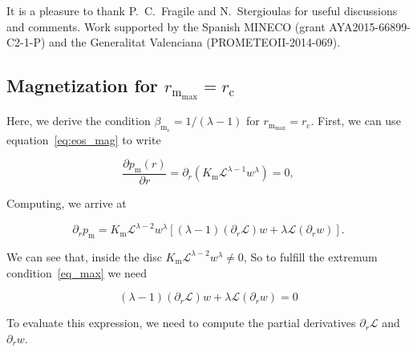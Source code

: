\documentclass[]{aa}
\begin{document}
\begin{acknowledgements}
It is a pleasure to thank P.~C.~Fragile and N.~Stergioulas for useful discussions and comments. Work supported by the Spanish MINECO (grant AYA2015-66899-C2-1-P) and the Generalitat Valenciana (PROMETEOII-2014-069).
\end{acknowledgements}




\begin{appendix}
\section{Magnetization for $r_{\mathrm{m}_{\mathrm{max}}} = r_{\mathrm{c}}$}\label{app_magmax}

Here, we derive the condition $\beta_{\mathrm{m}_{\mathrm{c}}} = 1/(\lambda - 1)$ for $r_{\mathrm{m}_{\mathrm{max}}} = r_{\mathrm{c}}$.
First, we can use equation~\eqref{eq:eos_mag} to write 

\begin{equation}\label{eq_max}
\frac{\partial{p_{\mathrm{m}}(r)}}{\partial r} = \partial_{r} \left(K_{\mathrm{m}} \mathcal{L}^{\lambda -1} w^{\lambda}\right) = 0,
\end{equation}

Computing, we arrive at

\begin{equation}
\partial_{r} p_{\mathrm{m}} = K_{\mathrm{m}} \mathcal{L}^{\lambda - 2}w^{\lambda} [(\lambda - 1)(\partial_r \mathcal{L}) w + \lambda \mathcal{L} (\partial_r w)].
\end{equation}

We can see that, inside the disc $K_{\mathrm{m}} \mathcal{L}^{\lambda - 2}w^{\lambda} \neq 0$, So to fulfill the extremum condition~\eqref{eq_max} we need 

\begin{equation}
(\lambda - 1)(\partial_r \mathcal{L}) w + \lambda \mathcal{L} (\partial_r w) = 0
\end{equation}

To evaluate this expression, we need to compute the partial derivatives $\partial_r \mathcal{L}$ and $\partial_r w$. 

\end{appendix}
\end{document}
